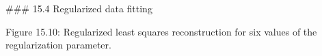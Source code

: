 

### 15.4 Regularized data fitting

Figure 15.10: Regularized least squares reconstruction for six values of the regularization parameter.

